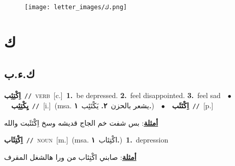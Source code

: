 \documentclass[10pt,a4paper,twoside]{article} %
\begin{document}
\begin{figure*}[t!]\centering\texttt{[image: letter\_images/ك.png]}\end{figure*}
\color{white}

 \section*{\foreignlanguage{arabic}{ك}} 
 \begin{multicols}{2} 

%
\color{black}
\vspace{-3mm}
\subsection*{\color{blue}\foreignlanguage{arabic}{ك.ء.ب}\color{blue}{}} 

{\setlength\topsep{0pt}\textbf{\foreignlanguage{arabic}{اِكْتِئِب}}\ {\color{gray}\texttt{//}\color{black}}\ \textsc{verb}\ [c.]\ \textbf{1.}~be depressed.  \textbf{2.}~feel disappointed.  \textbf{3.}~feel sad\ \ $\bullet$\ \ \setlength\topsep{0pt}\textbf{\foreignlanguage{arabic}{يِكْتِئِب}}\ {\color{gray}\texttt{//}\color{black}}\ [i.]\ \color{gray}(msa. \foreignlanguage{arabic}{يشعر بالحزن}~\foreignlanguage{arabic}{\textbf{٢.}}  \foreignlanguage{arabic}{يَكْتَئِب}~\foreignlanguage{arabic}{\textbf{١.}})\color{black}\ \ $\bullet$\ \ \setlength\topsep{0pt}\textbf{\foreignlanguage{arabic}{اِكْتَئَب}}\ {\color{gray}\texttt{//}\color{black}}\ [p.]\  \begin{flushright}\color{gray}\foreignlanguage{arabic}{\textbf{\underline{\foreignlanguage{arabic}{أمثلة}}}: بس شفت خم الجاج قديشه وسخ اِكْتَئَبت والله}\end{flushright}\color{black}} \vspace{2mm}

{\setlength\topsep{0pt}\textbf{\foreignlanguage{arabic}{اِكْتِئَاب}}\ {\color{gray}\texttt{//}\color{black}}\ \textsc{noun}\ [m.]\ \color{gray}(msa. \foreignlanguage{arabic}{اكْتِئاب}~\foreignlanguage{arabic}{\textbf{١.}})\color{black}\ \textbf{1.}~depression\  \begin{flushright}\color{gray}\foreignlanguage{arabic}{\textbf{\underline{\foreignlanguage{arabic}{أمثلة}}}: صابني اكْتِئاب من ورا هالشغل المقرف}\end{flushright}\color{black}} \vspace{2mm}


\end{multicols}
\end{document}
